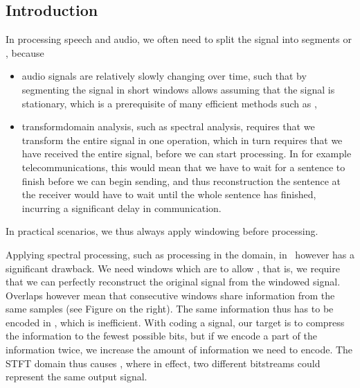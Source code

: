 \documentclass[letterpaper,10pt,english]{jupyterBook}
\begin{document}
\subsection{Introduction}
\label{\detokenize{Transmission/Modified_discrete_cosine_transform_MDCT:introduction}}
\sphinxAtStartPar
In processing speech and audio, we often need to split the signal into
segments or {\hyperref[\detokenize{Representations/Windowing::doc}]{}}, because
\begin{itemize}
\item {} 
\sphinxAtStartPar
audio signals are relatively slowly changing over time, such that by
segmenting the signal in short windows allows assuming that the
signal is stationary, which is a pre\sphinxhyphen{}requisite of many efficient
methods such as {\hyperref[\detokenize{Representations/Spectrogram_and_the_STFT::doc}]{}},

\item {} 
\sphinxAtStartPar
transform\sphinxhyphen{}domain analysis, such as spectral analysis, requires that
we transform the entire signal in one operation, which in turn
requires that we have received the entire signal, before we can
start processing. In for example telecommunications, this would mean
that we have to wait for a sentence to finish before we can begin
sending, and thus reconstruction the sentence at the receiver would
have to wait until the whole sentence has finished, incurring a
significant delay in communication.

\end{itemize}

\sphinxAtStartPar
In practical scenarios, we thus always apply windowing before
processing.

\sphinxAtStartPar
Applying spectral processing, such as processing in the
{\hyperref[\detokenize{Representations/Spectrogram_and_the_STFT::doc}]{}} domain, in  however has a significant drawback. We need windows which
are  to allow , that is, we require
that we can perfectly reconstruct the original signal from the windowed
signal. Overlaps however mean that consecutive windows share information
from the same samples (see Figure on the right). The same information
thus has to be encoded in , which is inefficient. With
coding a signal, our target is to compress the information to the fewest
possible bits, but if we encode a part of the information twice, we
increase the amount of information we need to encode. The STFT domain
thus causes , where in effect, two different bit\sphinxhyphen{}streams
could represent the same output signal.
\end{document}
